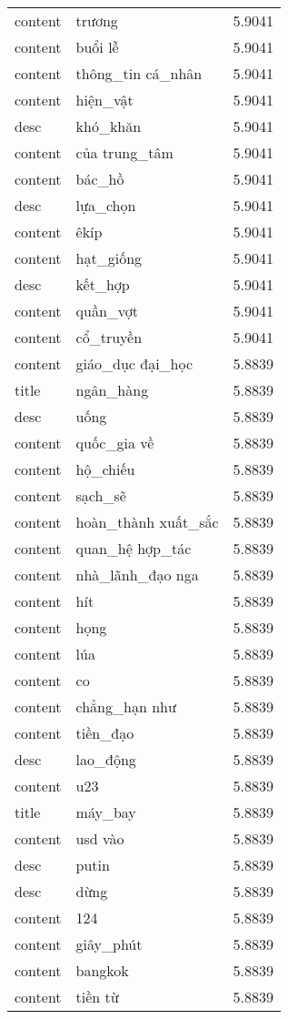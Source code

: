 \documentclass{article}
\begin{document}
\begin{tabular}{lll}
content & trương & 5.9041\\
content & buổi lễ & 5.9041\\
content & thông\_tin cá\_nhân & 5.9041\\
content & hiện\_vật & 5.9041\\
desc & khó\_khăn & 5.9041\\
content & của trung\_tâm & 5.9041\\
content & bác\_hồ & 5.9041\\
desc & lựa\_chọn & 5.9041\\
content & êkíp & 5.9041\\
content & hạt\_giống & 5.9041\\
desc & kết\_hợp & 5.9041\\
content & quần\_vợt & 5.9041\\
content & cổ\_truyền & 5.9041\\
content & giáo\_dục đại\_học & 5.8839\\
title & ngân\_hàng & 5.8839\\
desc & uống & 5.8839\\
content & quốc\_gia về & 5.8839\\
content & hộ\_chiếu & 5.8839\\
content & sạch\_sẽ & 5.8839\\
content & hoàn\_thành xuất\_sắc & 5.8839\\
content & quan\_hệ hợp\_tác & 5.8839\\
content & nhà\_lãnh\_đạo nga & 5.8839\\
content & hít & 5.8839\\
content & họng & 5.8839\\
content & lúa & 5.8839\\
content & co & 5.8839\\
content & chẳng\_hạn như & 5.8839\\
content & tiền\_đạo & 5.8839\\
desc & lao\_động & 5.8839\\
content & u23 & 5.8839\\
title & máy\_bay & 5.8839\\
content & usd vào & 5.8839\\
desc & putin & 5.8839\\
desc & dừng & 5.8839\\
content & 124 & 5.8839\\
content & giây\_phút & 5.8839\\
content & bangkok & 5.8839\\
content & tiền từ & 5.8839\\

\end{tabular}
\end{document}
